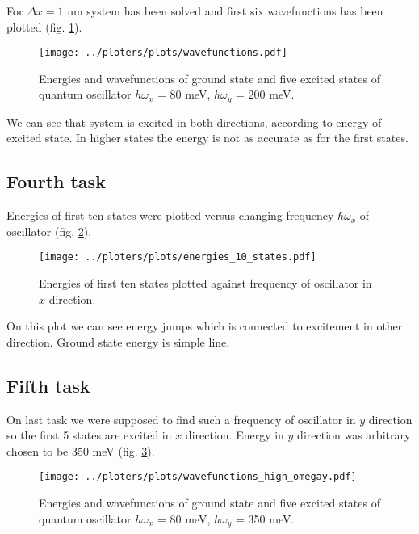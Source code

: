 \documentclass[a4paper, 12pt]{article}
\begin{document}
For $\Delta x = 1$ nm system has been solved and first six wavefunctions has been plotted (fig. \ref{fig:wavefunctions}). 

\begin{figure}[h]
    \begin{center}
        \texttt{[image: ../ploters/plots/wavefunctions.pdf]}
    \end{center}
    \caption{Energies and wavefunctions of ground state and five excited states of quantum oscillator $h\omega_x$ = 80 meV, $h\omega_y$ = 200 meV.}
    \label{fig:wavefunctions}
\end{figure}

We can see that system is excited in both directions, according to energy of excited state.
In higher states the energy is not as accurate as for the first states.

\newpage
\subsection*{Fourth task}

Energies of first ten states were plotted versus changing frequency $\hbar\omega_x$ of oscillator (fig. \ref{fig:energies}).

\begin{figure}[h]
    \begin{center}
        \texttt{[image: ../ploters/plots/energies\_10\_states.pdf]}
    \end{center}
    \caption{Energies of first ten states plotted against frequency of oscillator in $x$ direction.}\label{fig:energies}
\end{figure}

On this plot we can see energy jumps which is connected to excitement in other direction.
Ground state energy is simple line.

\newpage
\subsection*{Fifth task}
On last task we were supposed to find such a frequency of oscillator in $y$ direction so the first 5 states are excited in $x$ direction.
Energy in $y$ direction was arbitrary chosen to be 350 meV (fig. \ref{fig:wavefunctions_high}).

\begin{figure}[h]
    \begin{center}
        \texttt{[image: ../ploters/plots/wavefunctions\_high\_omegay.pdf]}
    \end{center}
    \caption{Energies and wavefunctions of ground state and five excited states of quantum oscillator $h\omega_x$ = 80 meV, $h\omega_y$ = 350 meV.}
    \label{fig:wavefunctions_high}
\end{figure}
\end{document}
